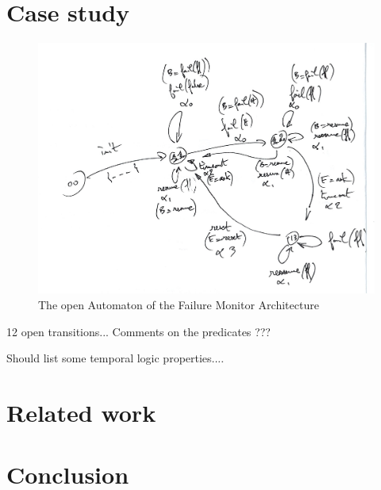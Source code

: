 \documentclass{llncs}
\begin{document}
\section{Case study}
\label{secn:case-study}

\begin{figure}[t]
  \centering
  \includegraphics[width=\columnwidth]{TimerOpenAut}
  \caption{The open Automaton of the Failure Monitor Architecture}
  \label{schema:ArchFailure:BIP}
\end{figure}

12 open transitions... Comments on the predicates ???

Should list some temporal logic properties....


\section{Related work}
\label{secn:related}


\section{Conclusion}
\label{secn:conclusion}

\end{document}
